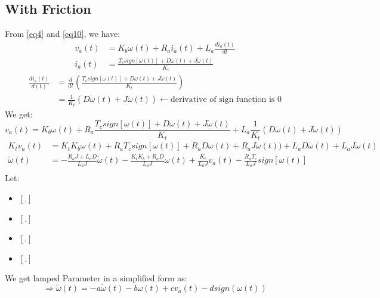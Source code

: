 \documentclass[12pt,a4paper]{article}
\begin{document}
	\subsection{With Friction}
	From \autoref{eq4} and \autoref{eq10}, we have:
	\[\begin{split}
		v_a(t) &= K_b \omega(t) + R_a i_a(t) + L_a \frac{di_a(t)}{dt} \\
		i_a(t) &= \frac{T_c sign[\omega(t)] +D\omega(t) + J \dot{\omega}(t)}{K_t}
	\end{split}\]
	\[\begin{split}
		\frac{di_a(t)}{d(t)} &= \frac{d}{dt}\left(\frac{T_c sign[\omega(t)] +D\omega(t) + J \dot{\omega}(t)}{K_t}\right) \\
		&= \frac{1}{K_t} (D\dot{\omega}(t) + J \ddot{\omega}(t)) \leftarrow \text{derivative of sign function is 0}
	\end{split}\]
	We get:
	\begin{equation}
		v_a(t) = K_b \omega(t) + R_a \frac{T_c sign[\omega(t)] + D\omega(t) + J \dot{\omega}(t)}{K_t} + L_a\frac{1}{K_t} (D\dot{\omega}(t) + J \ddot{\omega}(t))
		\label{eq17}
	\end{equation}
	\[\begin{split}
		K_tv_a(t) &= K_tK_b \omega(t) + R_aT_c sign[\omega(t)] + R_aD\omega(t) + R_aJ \dot{\omega}(t)) + L_a D\dot{\omega}(t) + L_a J \ddot{\omega}(t) \\
		\ddot{\omega}(t) &= - \frac{R_a J + L_a D}{L_aJ} \dot{\omega}(t) -\frac{K_tK_b + R_a D}{L_aJ} \omega(t)  + \frac{K_t}{L_aJ}v_a(t) - \frac{R_aT_c}{L_aJ} sign[\omega(t)]\\
	\end{split}\]
	Let:
	\begin{itemize}
		\item { \([.]\) }
		\item { \([.]\) }
		\item { \([.]\) }
		\item { \([.]\) }
	\end{itemize}
	We get lamped Parameter in a simplified form as:
	\begin{equation}
		\Rightarrow \boxed{\ddot{\omega}(t) = - a\dot{\omega}(t) - b\omega(t) + cv_a(t) - dsign(\omega(t))}
		\label{eq18}
	\end{equation}
\end{document}
